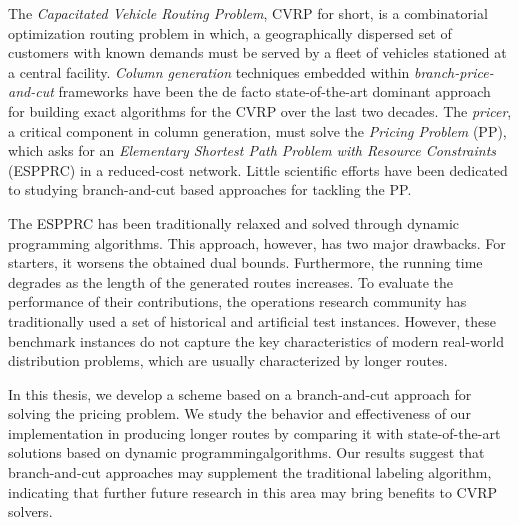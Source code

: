 \noindent The \textit{Capacitated Vehicle Routing Problem}, CVRP for short,
is a combinatorial optimization routing problem in which,
a geographically dispersed set of customers with known demands
must be served by a fleet of vehicles stationed at a central facility.
\textit{Column generation} techniques embedded within \textit{branch-price-and-cut} frameworks
have been the de facto state-of-the-art dominant approach
for building exact algorithms for the CVRP over the last two decades.
The \textit{pricer}, a critical component in column generation, must solve
the \textit{Pricing Problem} (PP), which asks for an
\textit{Elementary Shortest Path Problem with Resource Constraints} (ESPPRC)
in a reduced-cost network.
Little scientific efforts have been dedicated to studying
branch-and-cut based approaches for tackling the PP.

The ESPPRC has been traditionally relaxed and solved through dynamic programming algorithms.
This approach, however, has two major drawbacks.
For starters, it worsens the obtained dual bounds.
Furthermore, the running time degrades as the length of the generated routes increases.
To evaluate the performance of their contributions, the operations research community has traditionally used a set of historical and artificial test instances.
However, these benchmark instances do not capture the key characteristics of modern real-world distribution problems, which are usually characterized by longer routes.

\noindent In this thesis, we develop
a scheme based on a branch-and-cut approach for solving the pricing problem.
We study the behavior and effectiveness of our implementation in producing longer routes by comparing it with state-of-the-art solutions based on dynamic programmingalgorithms.
Our results suggest that branch-and-cut approaches may supplement the traditional labeling algorithm, indicating that further future research in this area may bring benefits to CVRP solvers.
